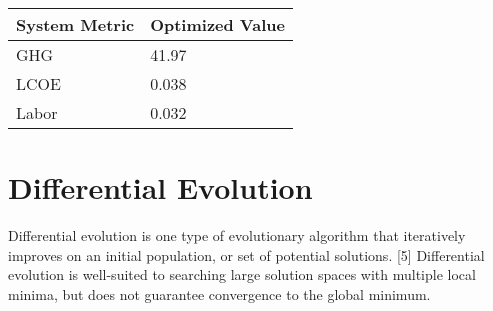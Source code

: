 \documentclass[letterpaper,10pt,english]{sphinxmanual}
\begin{document}
\begin{savenotes}\sphinxattablestart
\centering
\begin{tabulary}{\linewidth}[t]{|T|T|}
\hline
\sphinxstyletheadfamily 
System Metric
&\sphinxstyletheadfamily 
Optimized Value
\\
\hline
GHG
&
41.97
\\
\hline
LCOE
&
0.038
\\
\hline
Labor
&
0.032
\\
\hline
\end{tabulary}
\par
\sphinxattableend\end{savenotes}


\section{Differential Evolution}
\label{\detokenize{optimizers:differential-evolution}}
Differential evolution is one type of evolutionary algorithm that
iteratively improves on an initial population, or set of potential
solutions. {[}5{]} Differential evolution is well-suited to searching large
solution spaces with multiple local minima, but does not guarantee
convergence to the global minimum.

\end{document}
